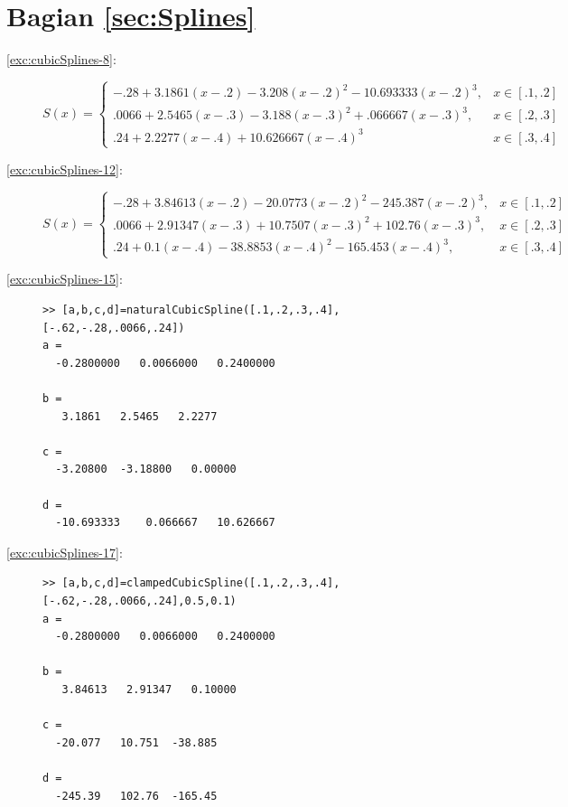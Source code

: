 \section*{Bagian \ref{sec:Splines}}
\begin{description}
\item [{\ref{exc:cubicSplines-8}:}] 
\[
S(x)=\begin{cases}
-.28+3.1861(x-.2)-3.208(x-.2)^{2}-10.693333(x-.2)^{3}, & x\in[.1,.2]\\
.0066+2.5465(x-.3)-3.188(x-.3)^{2}+.066667(x-.3)^{3}, & x\in[.2,.3]\\
.24+2.2277(x-.4)+10.626667(x-.4)^{3} & x\in[.3,.4]
\end{cases}
\]
\item [{\ref{exc:cubicSplines-12}:}] 
\[
S(x)=\begin{cases}
-.28+3.84613(x-.2)-20.0773(x-.2)^{2}-245.387(x-.2)^{3}, & x\in[.1,.2]\\
.0066+2.91347(x-.3)+10.7507(x-.3)^{2}+102.76(x-.3)^{3}, & x\in[.2,.3]\\
.24+0.1(x-.4)-38.8853(x-.4)^{2}-165.453(x-.4)^{3}, & x\in[.3,.4]
\end{cases}
\]
\item [{\ref{exc:cubicSplines-15}:}] \begin{verbatim}
>> [a,b,c,d]=naturalCubicSpline([.1,.2,.3,.4],[-.62,-.28,.0066,.24])
a =
  -0.2800000   0.0066000   0.2400000

b =
   3.1861   2.5465   2.2277

c =
  -3.20800  -3.18800   0.00000

d =
  -10.693333    0.066667   10.626667
\end{verbatim}
\item [{\ref{exc:cubicSplines-17}:}] \begin{verbatim}
>> [a,b,c,d]=clampedCubicSpline([.1,.2,.3,.4],[-.62,-.28,.0066,.24],0.5,0.1)
a =
  -0.2800000   0.0066000   0.2400000

b =
   3.84613   2.91347   0.10000

c =
  -20.077   10.751  -38.885

d =
  -245.39   102.76  -165.45
\end{verbatim}
\end{description}


